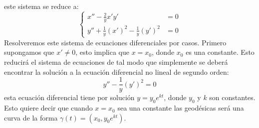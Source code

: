 \begin{example}
	este sistema se reduce a:
	\[
		\begin{cases}
			x'' - \frac{2}{y} x'y'                         & = 0 \\[12pt]
			y'' + \frac{1}{y} (x')^2 - \frac{1}{y}(y')^{2} & = 0
		\end{cases}
	\]
	Resolveremos este sistema de ecuaciones diferenciales por casos. Primero supongamos que $x' \neq 0$, esto implica que $x = x_{0}$, donde $x_0$ es una constante. Esto reducirá el sistema de ecuaciones de tal modo que simplemente se deberá encontrar la solución a la ecuación diferencial no lineal de segundo orden:
	\[
		y'' - \frac{1}{y}(y')^{2} = 0
	\]
	esta ecuación diferencial tiene por solución $y = y_0 e^{kt}$, donde $y_0$ y $k$ son constantes. Esto quiere decir que cuando $x = x_0$ sea una constante las geodésicas será una curva de la forma $\gamma(t) = (x_0, y_0 e^{kt})$.


\end{example}
